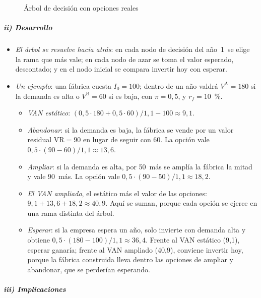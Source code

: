\documentclass[11pt]{article}
\begin{document}
\begin{figure}[H]
\centering
\caption{Árbol de decisión con opciones reales}\label{fig:arbol-opciones}
\end{figure}

\subparagraph{ii) Desarrollo}

\begin{itemize}
\item \emph{El árbol se resuelve hacia atrás}: en cada nodo de decisión del año~1~se elige la rama que más vale; en cada nodo de azar se toma el valor esperado, descontado; y en el nodo inicial se compara invertir hoy con esperar.
\item \emph{Un ejemplo}: una fábrica cuesta $I_0=100$; dentro de un año valdrá $V^{\mathrm A}=180$ si la demanda es alta o $V^{\mathrm B}=60$ si es baja, con $\pi=0{,}5$, y $r_f=10$~\%.
  \begin{itemize}
  \item \emph{VAN estático}: $(0{,}5\cdot180+0{,}5\cdot60)/1{,}1-100\approx9{,}1$.
  \item \emph{Abandonar}: si la demanda es baja, la fábrica se vende por un valor residual $\mathrm{VR}=90$ en lugar de seguir con 60. La opción vale $0{,}5\cdot(90-60)/1{,}1\approx13{,}6$.
  \item \emph{Ampliar}: si la demanda es alta, por 50~más se amplía la fábrica la mitad y vale 90~más. La opción vale $0{,}5\cdot(90-50)/1{,}1\approx18{,}2$.
  \item \emph{El VAN ampliado}, el estático más el valor de las opciones\nocite{Trigeorgis1996Real}: $9{,}1+13{,}6+18{,}2\approx40{,}9$. Aquí se suman, porque cada opción se ejerce en una rama distinta del árbol.
  \item \emph{Esperar}: si la empresa espera un año, solo invierte con demanda alta y obtiene $0{,}5\cdot(180-100)/1{,}1\approx36{,}4$. Frente al VAN estático (9,1), esperar ganaría; frente al VAN ampliado (40,9), conviene invertir hoy, porque la fábrica construida lleva dentro las opciones de ampliar y abandonar, que se perderían esperando.
  \end{itemize}
\end{itemize}

\subparagraph{iii) Implicaciones}
\end{document}
